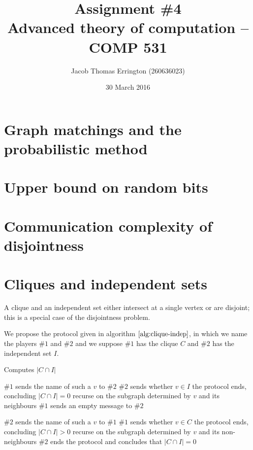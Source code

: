 \documentclass[letterpaper,11pt]{article}
\author{Jacob Thomas Errington (260636023)}
\title{Assignment \#4\\Advanced theory of computation -- COMP 531}
\date{30 March 2016}
\begin{document}
\maketitle

\section{Graph matchings and the probabilistic method}

\section{Upper bound on random bits}

\section{Communication complexity of disjointness}

\section{Cliques and independent sets}

A clique and an independent set either intersect at a single vertex or are
disjoint; this is a special case of the disjointness problem.

We propose the protocol given in algorithm $\ref{alg:clique-indep}$, in which
we name the players $\#1$ and $\#2$ and we suppose $\#1$ has the clique $C$ and
$\#2$ has the independent set $I$.

\begin{algorithm}
    \caption{Computes $|C \cap I|$}
    \begin{algorithmic}
            \State $\#1$ sends the name of such a $v$ to $\#2$
            \State $\#2$ sends whether $v \in I$
                \State the protocol ends, concluding $|C \cap I| = 0$
            \Else
                \State recurse on the subgraph determined by $v$ and its
                neighbours
            \EndIf
        \Else
            \State $\#1$ sends an empty message to $\#2$
        \EndIf

            \State $\#2$ sends the name of such a $v$ to $\#1$
            \State $\#1$ sends whether $v \in C$
                \State the protocol ends, concluding $|C \cap I| > 0$
            \Else
                \State recurse on the subgraph determined by $v$ and its
                non-neighbours
            \EndIf
        \Else
            $\#2$ ends the protocol and concludes that $|C \cap I| = 0$
        \EndIf
    \end{algorithmic}
    \label{alg:clique-indep}
\end{algorithm}
\end{document}
